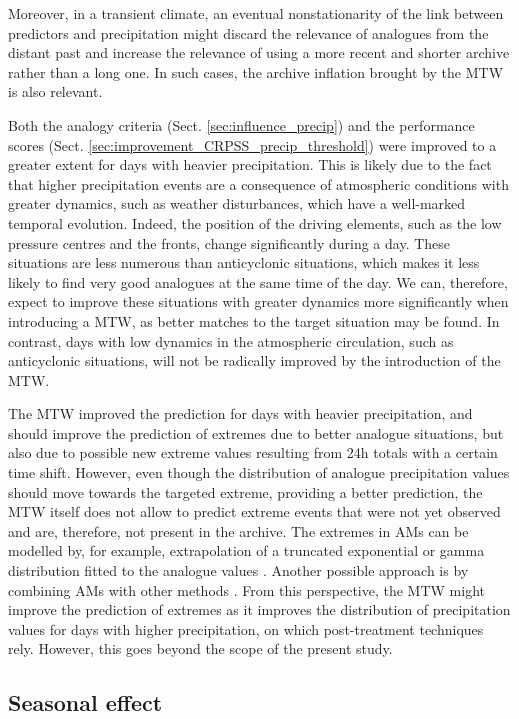 \documentclass[hess, manuscript]{copernicus}
\begin{document}
	Moreover, in a transient climate, an eventual nonstationarity of the link between predictors and precipitation might discard the relevance of analogues from the distant past and increase the relevance of using a more recent and shorter archive rather than a long one. In such cases, the archive inflation brought by the MTW is also relevant.
	
	Both the analogy criteria (Sect. \ref{sec:influence_precip}) and the performance scores (Sect. \ref{sec:improvement_CRPSS_precip_threshold}) were improved to a greater extent for days with heavier precipitation. This is likely due to the fact that higher precipitation events are a consequence of atmospheric conditions with greater dynamics, such as weather disturbances, which have a well-marked temporal evolution. Indeed, the position of the driving elements, such as the low pressure centres and the fronts, change significantly during a day. These situations are less numerous than anticyclonic situations, which makes it less likely to find very good analogues at the same time of the day. We can, therefore, expect to improve these situations with greater dynamics more significantly when introducing a MTW, as better matches to the target situation may be found. In contrast, days with low dynamics in the atmospheric circulation, such as anticyclonic situations, will not be radically improved by the introduction of the MTW.
	
	The MTW improved the prediction for days with heavier precipitation, and should improve the prediction of extremes due to better analogue situations, but also due to possible new extreme values resulting from 24h totals with a certain time shift. However, even though the distribution of analogue precipitation values should move towards the targeted extreme, providing a better prediction, the MTW itself does not allow to predict extreme events that were not yet observed and are, therefore, not present in the archive. The extremes in AMs can be modelled by, for example, extrapolation of a truncated exponential or gamma distribution fitted to the analogue values \citep{Obled2002}. Another possible approach is by combining AMs with other methods \citep[e.g.][]{Chardon2014}. From this perspective, the MTW might improve the prediction of extremes as it improves the distribution of precipitation values for days with higher precipitation, on which post-treatment techniques rely. However, this goes beyond the scope of the present study.
	
	
	\subsection{Seasonal effect}
	
\end{document}
